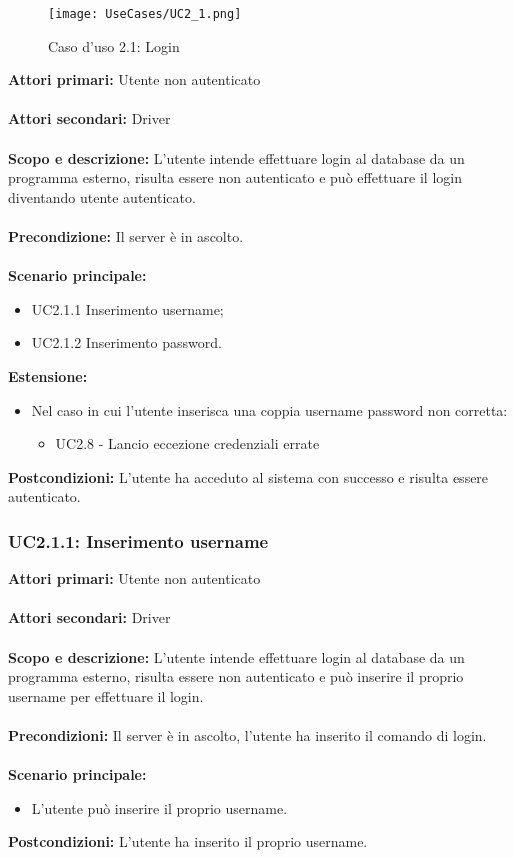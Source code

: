 \documentclass{scalatekids-article}
\begin{document}
\begin{figure}[H]
  \begin{center}
    \texttt{[image: UseCases/UC2\_1.png]}
    \caption*{Caso d'uso 2.1: Login}
  \end{center}
\end{figure}
\textbf{Attori primari:} Utente non autenticato\\ \\
\textbf{Attori secondari:} Driver\\ \\
\textbf{Scopo e descrizione:}
L'utente intende effettuare login al database da un programma  esterno, risulta essere non autenticato e può effettuare il login diventando utente autenticato.\\ \\
\textbf{Precondizione:} Il server è in ascolto.\\ \\
\textbf{Scenario principale:}
\begin{itemize}
\item UC2.1.1 Inserimento username;
\item UC2.1.2 Inserimento password.
\end{itemize}
\textbf{Estensione:}
\begin{itemize}
\item Nel caso in cui l'utente inserisca una coppia username password non corretta:
  \begin{itemize}
    \item UC2.8 - Lancio eccezione credenziali errate
  \end{itemize}
\end{itemize}
\textbf{Postcondizioni:} L'utente ha acceduto al sistema con successo e risulta essere autenticato.

\subsubsection{UC2.1.1: Inserimento username}

\textbf{Attori primari:} Utente non autenticato\\ \\
\textbf{Attori secondari:} Driver\\ \\
\textbf{Scopo e descrizione:}
L'utente intende effettuare login al database da un programma  esterno, risulta essere non autenticato e può inserire il proprio username per effettuare il login.\\ \\
\textbf{Precondizioni:} Il server è in ascolto, l'utente ha inserito il comando di login.\\ \\
\textbf{Scenario principale:}
\begin{itemize}
\item L'utente può inserire il proprio username.
\end{itemize}
\textbf{Postcondizioni:} L'utente ha inserito il proprio username.
\end{document}
